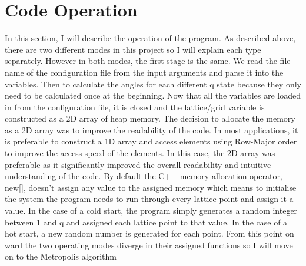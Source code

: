 \section{Code Operation}
In this section, I will describe the operation of the program. As described above, there are two different modes in this project so I will explain each type separately.
However in both modes, the first stage is the same.
We read the file name of the configuration file from the input arguments and parse it into the variables.
Then to calculate the angles for each different q state because they only need to be calculated once at the beginning.
Now that all the variables are loaded in from the configuration file, it is closed and the lattice/grid variable is constructed as a 2D array of heap memory.
The decision to allocate the memory as a 2D array was to improve the readability of the code.
In most applications, it is preferable to construct a 1D array and access elements using Row-Major order to improve the access speed of the elements.
In this case, the 2D array was preferable as it significantly improved the overall readability and intuitive understanding of the code.
By default the C++ memory allocation operator, new[], doesn't assign any value to the assigned memory which means to initialise the system the program needs to run through every lattice point and assign it a value.
In the case of a cold start, the program simply generates a random integer between 1 and q and assigned each lattice point to that value.
In the case of a hot start, a new random number is generated for each point.
From this point on ward the two operating modes diverge in their assigned functions so I will move on to the Metropolis algorithm

